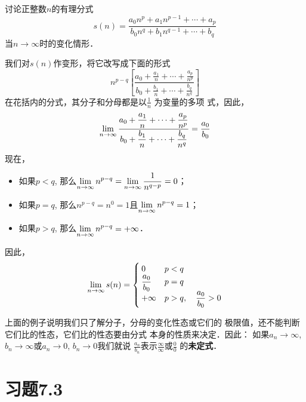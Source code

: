 \begin{example}
    讨论正整数$n$的有理分式
\[s(n)=\frac{a_0n^p+a_1n^{p-1}+\cdots+a_p}{b_0n^q+b_1n^{q-1}+\cdots+b_q}\]
当$n\to\infty$时的变化情形．
\end{example}

\begin{solution}
    我们对$s(n)$作变形，将它改写成下面的形式
\[n^{p-q}\left[\frac{a_0+\frac{a_1}{n}+\cdots+\frac{a_p}{n^p}}{b_0+\frac{b_1}{n}+\cdots+\frac{b_q}{n^q}}\right]\]
在花括内的分式，其分子和分母都是以$\frac{1}{n}$
为变量的多项
式，因此，
\[ \displaystyle\lim_{n\to\infty}\dfrac{a_0+\dfrac{a_1}{n}+\cdots+\dfrac{a_p}{n^p}}{b_0+\dfrac{b_1}{n}+\cdots+\dfrac{b_q}{n^q}}=\dfrac{a_0}{b_0}\]
现在，
\begin{itemize}
    \item 如果$p<q$, 那么$\displaystyle\lim_{n\to\infty}n^{p-q}=\displaystyle\lim_{n\to\infty}\dfrac{1}{n^{q-p}}=0$；
    \item 如果$p=q$, 那么$n^{p-q}=n^0=1$且$\displaystyle\lim_{n\to\infty}n^{p-q}=1$；
    \item 如果$p>q$, 那么$\displaystyle\lim_{n\to\infty}n^{p-q}=+\infty$．
\end{itemize}
因此，
\[ \displaystyle\lim_{n\to\infty} s(n)=\begin{cases}
   0& p<q\\
\dfrac{a_0}{b_0} & p=q\\
+\infty & p>q,\quad \dfrac{a_0}{b_0}>0
\end{cases}\]
\end{solution}

上面的例子说明我们只了解分子，分母的变化性态或它们的
极限值，还不能判断它们比的性态，它们比的性态要由分式
本身的性质来决定．因此：
如果$a_n\to\infty$, $b_n\to\infty$或$a_n\to 0$, $b_n\to 0$我们就说
$\frac{a_n}{b_n}$表示$\frac{\infty}{\infty}$或$\frac{0}{0}$
的\textbf{未定式}．

\section*{习题7.3}

